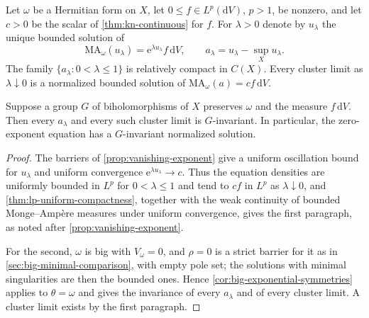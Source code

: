 \begin{proposition}\label{prop:symmetric-equation-clusters}
Let $\omega$ be a Hermitian form on $X$, let $0\leq f\in L^p(\mathrm{d}V)$, $p>1$, be nonzero, and let $c>0$ be the scalar of \cref{thm:kn-continuous} for $f$. For $\lambda>0$ denote by $u_\lambda$ the unique bounded solution of
\[
 \mathrm{MA}_\omega(u_\lambda)=\mathrm{e}^{\lambda u_\lambda}f\,\mathrm{d}V,
 \qquad a_\lambda=u_\lambda-\sup_Xu_\lambda.
\]
The family $\{a_\lambda:0<\lambda\leq1\}$ is relatively compact in $C(X)$. Every cluster limit as $\lambda\downarrow0$ is a normalized bounded solution of $\mathrm{MA}_\omega(a)=cf\,\mathrm{d}V$.

Suppose a group $G$ of biholomorphisms of $X$ preserves $\omega$ and the measure $f\,\mathrm{d}V$. Then every $a_\lambda$ and every such cluster limit is $G$-invariant. In particular, the zero-exponent equation has a $G$-invariant normalized solution.
\end{proposition}
\begin{proof}
The barriers of \cref{prop:vanishing-exponent} give a uniform oscillation bound for $u_\lambda$ and uniform convergence $\mathrm{e}^{\lambda u_\lambda}\to c$. Thus the equation densities are uniformly bounded in $L^p$ for $0<\lambda\leq1$ and tend to $cf$ in $L^p$ as $\lambda\downarrow0$, and \cref{thm:lp-uniform-compactness}, together with the weak continuity of bounded Monge--Amp\`ere measures under uniform convergence, gives the first paragraph, as noted after \cref{prop:vanishing-exponent}.

For the second, $\omega$ is big with $V_\omega=0$, and $\rho=0$ is a strict barrier for it as in \cref{sec:big-minimal-comparison}, with empty pole set; the solutions with minimal singularities are then the bounded ones. Hence \cref{cor:big-exponential-symmetries} applies to $\theta=\omega$ and gives the invariance of every $a_\lambda$ and of every cluster limit. A cluster limit exists by the first paragraph.
\end{proof}


